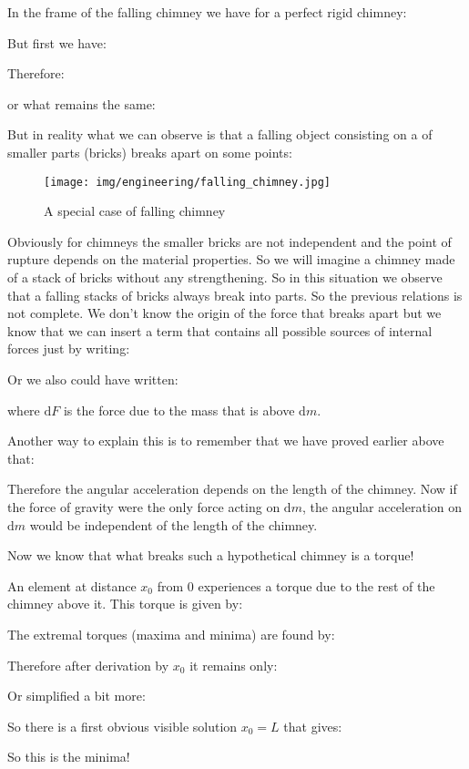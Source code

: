 	In the frame of the falling chimney we have for a perfect rigid chimney:
	
	But first we have:
	
	Therefore:
	
	or what remains the same:
	
	But in reality what we can observe is that a falling object consisting on a of smaller parts (bricks) breaks apart on some points:
	\begin{figure}[H]
		\centering
		\texttt{[image: img/engineering/falling\_chimney.jpg]}
		\caption{A special case of falling chimney}
	\end{figure}
	Obviously for chimneys the smaller bricks are not independent and the point of rupture depends on the material properties. So we will imagine a chimney made of a stack of bricks without any strengthening. So in this situation we observe that a falling stacks of bricks always break into parts. So the previous relations is not complete. We don't know the origin of the force that breaks apart but we know that we can insert a term that contains all possible sources of internal forces just by writing:
	
	Or we also could have written:
	
	where $\mathrm{d}F$ is the force due to the mass that is above $\mathrm{d}m$.
	\begin{tcolorbox}[title=Remark,colframe=black,arc=10pt]
	Another way to explain this is to remember that we have proved earlier above that:
	
	Therefore the angular acceleration depends on the length of the chimney. Now if the force of gravity were the only force acting on $\mathrm{d}m$, the angular acceleration on $\mathrm{d}m$ would be independent of the length of the chimney.
	\end{tcolorbox}
	
	Now we know that what breaks such a hypothetical chimney is a torque!
	
	An element at distance $x_0$ from $0$ experiences a torque due to the rest of the chimney above it. This torque is given by:
	
	The extremal torques (maxima and minima) are found by:
	
	Therefore after derivation by $x_0$ it remains only:
	
	Or simplified a bit more:
	
	So there is a first obvious visible solution $x_0=L$ that gives:
	
	So this is the minima!
	
